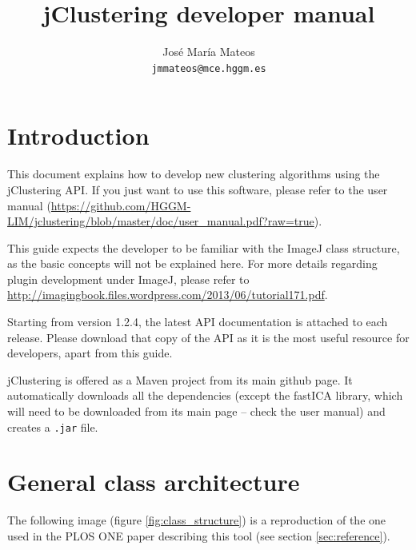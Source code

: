 \documentclass[11pt]{article} %
\title{jClustering developer manual}
\author{José María Mateos \\ \texttt{jmmateos@mce.hggm.es}}
\begin{document}
\lstset{language=Java, stringstyle=\ttfamily, basicstyle=\small, frame=single}

\maketitle

\tableofcontents

\section{Introduction}

This document explains how to develop new clustering algorithms using the jClustering API. If you just want to use this software, please refer to the user manual (\url{https://github.com/HGGM-LIM/jclustering/blob/master/doc/user_manual.pdf?raw=true}).

This guide expects the developer to be familiar with the ImageJ class structure, as the basic concepts will not be explained here.
For more details regarding plugin development under ImageJ, please refer to \url{http://imagingbook.files.wordpress.com/2013/06/tutorial171.pdf}.

Starting from version 1.2.4, the latest API documentation is attached to each release. Please download that copy of the API as it is the most useful resource for developers, apart from this guide.

jClustering is offered as a Maven project from its main github page. It automatically downloads all the dependencies (except the fastICA library, which will need to be downloaded from its main page -- check the user manual) and creates a {\tt .jar} file.

\section{General class architecture}

The following image (figure \ref{fig:class_structure}) is a reproduction of the one used in the PLOS ONE paper describing this tool (see section \ref{sec:reference}).
\end{document}
